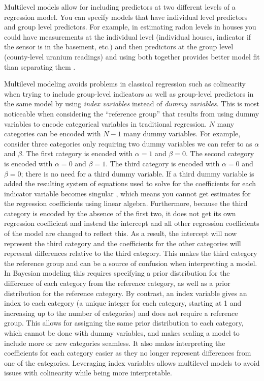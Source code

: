 Multilevel models allow for including predictors at two different levels of a regression model. You can specify models that have individual level predictors and group level predictors. For example, in estimating radon levels in houses you could have measurements at the individual level (individual houses, indicator if the sensor is in the basement, etc.) and then predictors at the group level (county-level uranium readings) and using both together provides better model fit than separating them \cite{Gelman2006b}.

Multilevel modeling avoids problems in classical regression such as colinearity when trying to include group-level indicators as well as group-level predictors in the same model by using \textit{index variables} instead of \textit{dummy variables}. This is most noticeable when considering the ``reference group'' that results from using dummy variables to encode categorical variables in traditional regression. $N$ many categories can be encoded with $N-1$ many dummy variables. For example, consider three categories only requiring two dummy variables we can refer to as $\alpha$ and $\beta$. The first category is encoded with $\alpha = 1$ and $\beta = 0$. The second category is encoded with $\alpha = 0$ and $\beta = 1$. The third category is encoded with $\alpha = 0$ and $\beta = 0$; there is no need for a third dummy variable. If a third dummy variable is added the resulting system of equations used to solve for the coefficients for each indicator variable becomes singular \cite{Fox2008}, which means you cannot get estimates for the regression coefficients using linear algebra. Furthermore, because the third category is encoded by the absence of the first two, it does not get its own regression coefficient and instead the intercept and all other regression coefficients of the model are changed to reflect this. As a result, the intercept will now represent the third category and the coefficients for the other categories will represent differences relative to the third category. This makes the third category the reference group and can be a source of confusion when interpretting a model. In Bayesian modeling this requires specifying a prior distribution for the difference of each category from the reference category, as well as a prior distribution for the reference category. By contrast, an index variable gives an index to each category (a unique integer for each category, starting at 1 and increasing up to the number of categories) and does not require a reference group. This allows for assigning the same prior distribution to each category, which cannot be done with dummy variables, and makes scaling a model to include more or new categories seamless. It also makes interpreting the coefficients for each category easier as they no longer represent differences from one of the categories. Leveraging index variables allows multilevel models to avoid issues with colinearity while being more interpretable.

